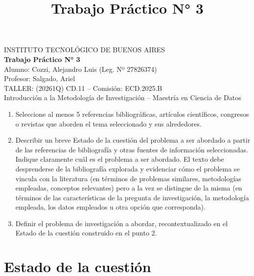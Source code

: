 \documentclass[12pt,a4paper]{article}
\title{\textbf{Trabajo Práctico N° 3}}
\author{}
\date{}
\begin{document}
\begin{center}
    {\large INSTITUTO TECNOLÓGICO DE BUENOS AIRES}\\[0.5em]
    {\Large \textbf{Trabajo Práctico N° 3}}\\[1em]
    Alumno: Cozzi, Alejandro Luis (Leg. Nº 27826374)\\
    Profesor: Salgado, Ariel\\
    TALLER: (20261Q) CD.11 -- Comisión: ECD.2025.B\\
    Introducción a la Metodología de Investigación -- Maestría en Ciencia de Datos
\end{center}

\vspace{1em}

\begin{enumerate}
    \item Seleccione al menos 5 referencias bibliográficas, artículos científicos, congresos o revistas que aborden el tema seleccionado y sus alrededores.

    \item Describir un breve Estado de la cuestión del problema a ser abordado a partir de las referencias de bibliografía y otras fuentes de información seleccionadas. Indique claramente cuál es el problema a ser abordado. El texto debe desprenderse de la bibliografía explorada y evidenciar cómo el problema se vincula con la literatura (en términos de problemas similares, metodologías empleadas, conceptos relevantes) pero a la vez se distingue de la misma (en términos de las características de la pregunta de investigación, la metodología empleada, los datos empleados u otra opción que corresponda).

    \item Definir el problema de investigación a abordar, recontextualizado en el Estado de la cuestión construido en el punto 2.
\end{enumerate}

\section*{Estado de la cuestión}
\end{document}
